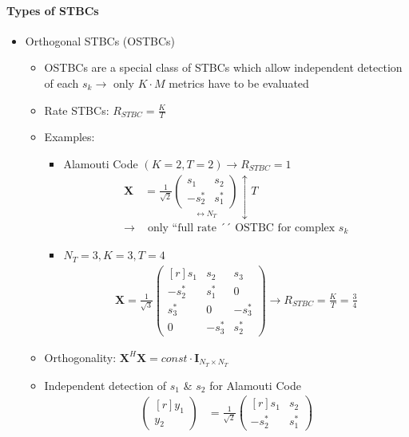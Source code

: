 \documentclass[a4paper, 10pt]{article}
\begin{document}
\paragraph{Types of STBCs}
\begin{itemize}
	\item Orthogonal STBCs (OSTBCs)
	\begin{itemize}
		\item OSTBCs are a special class of STBCs which allow independent detection of each $s_k \rightarrow$ only $K\cdot M$ metrics have to be evaluated
		\item Rate STBCs: $R_{STBC} = \frac{K}{T}$
		\item Examples:
		\begin{itemize}
			\item Alamouti Code  $(K = 2, T = 2) \rightarrow R_{STBC} = 1$
			\begin{align*}
				\textbf{X} &= \frac{1}{\sqrt{2}}\underset{\longleftrightarrow N_T}{\begin{pmatrix} s_1 & s_2 \\ -s_2^* & s_1^*	\end{pmatrix}}\updownarrow T\\
				\rightarrow &\text{ only ``full rate ´´ OSTBC for complex } s_k
			\end{align*}
			\item $N_T = 3, K = 3, T = 4$
			\begin{align*}
				\textbf{X} = \frac{1}{\sqrt{3}}\begin{pmatrix*}[r]	s_1 & s_2 & s_3 \\ -s_2^*  & s_1^* & 0 \\ s_3^* & 0 & -s_3^*\\0 & -s_3^* & s_2^*\end{pmatrix*} \rightarrow R_{STBC} = \frac{K}{T} = \frac{3}{4}
			\end{align*}
		\end{itemize}
		\item Orthogonality: $\textbf{X}^H\textbf{X} = {const}\cdot \textbf{I}_{N_T\times N_T}$
		\item Independent detection of $s_1$ \& $s_2$ for Alamouti Code
		\begin{align*}
				\begin{pmatrix*}[r]y_1 \\y_2 
			\end{pmatrix*} &= \frac{1}{\sqrt{2}}
			\begin{pmatrix*}[r]	s_1 & s_2 \\-s_2^* & s_1^*

\end{pmatrix*}
\end{align*}
\end{itemize}
\end{itemize}
\end{document}
